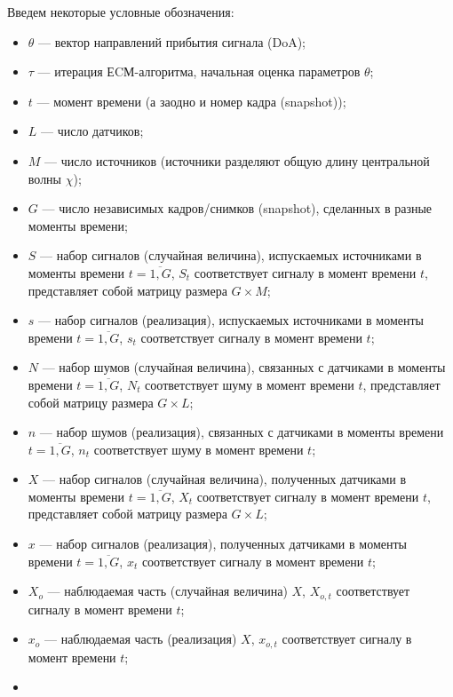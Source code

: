 \documentclass[11pt]{article}
\begin{document}
\begin{center}
\fontsize{20}{23}\selectfont {}
\end{center}
Введем некоторые условные обозначения:
\begin{itemize}
\item
$\theta$ --- вектор направлений прибытия сигнала (DoA);
\item
$\tau$ --- итерация ЕCМ-алгоритма, начальная оценка параметров $\theta$;
\item
$t$ --- момент времени (а заодно и номер кадра (snapshot));
\item
$L$ --- число датчиков;
\item
$M$ --- число источников (источники разделяют общую длину центральной волны $\chi$);
\item
$G$ --- число независимых кадров/снимков (snapshot), сделанных в разные моменты времени;
\item
$S$ --- набор сигналов (случайная величина), испускаемых источниками в моменты времени $t=\overline{1,G}$, $S_t$ соответствует сигналу в момент времени $t$, представляет собой матрицу размера $G \times M$;
\item
$s$ --- набор сигналов (реализация), испускаемых источниками в моменты времени $t=\overline{1,G}$, $s_t$ соответствует сигналу в момент времени $t$;
\item
$N$ --- набор шумов (случайная величина), связанных с датчиками в моменты времени $t=\overline{1,G}$, $N_t$ соответствует шуму в момент времени $t$, представляет собой матрицу размера $G \times L$;
\item
$n$ --- набор шумов (реализация), связанных с датчиками в моменты времени $t=\overline{1,G}$, $n_t$ соответствует шуму в момент времени $t$;
\item
$X$ --- набор сигналов (случайная величина), полученных датчиками в моменты времени $t=\overline{1,G}$, $X_t$ соответствует сигналу в момент времени $t$, представляет собой матрицу размера $G \times L$;
\item
$x$ --- набор сигналов (реализация), полученных датчиками в моменты времени $t=\overline{1,G}$, $x_t$ соответствует сигналу в момент времени $t$;
\item
$X_o$ --- наблюдаемая часть (случайная величина) $X$, $X_{o,t}$ соответствует сигналу в момент времени $t$; 
\item
$x_o$ --- наблюдаемая часть (реализация) $X$, $x_{o,t}$ соответствует сигналу в момент времени $t$;
\item

\end{itemize}
\end{document}
